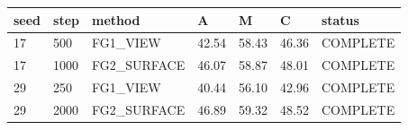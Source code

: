 \begin{tabular}{lllllll}
\toprule
seed & step & method & A & M & C & status \\
\midrule
17 & 500 & FG1\_VIEW & 42.54 & 58.43 & 46.36 & COMPLETE \\
17 & 1000 & FG2\_SURFACE & 46.07 & 58.87 & 48.01 & COMPLETE \\
29 & 250 & FG1\_VIEW & 40.44 & 56.10 & 42.96 & COMPLETE \\
29 & 2000 & FG2\_SURFACE & 46.89 & 59.32 & 48.52 & COMPLETE \\
\bottomrule
\end{tabular}
